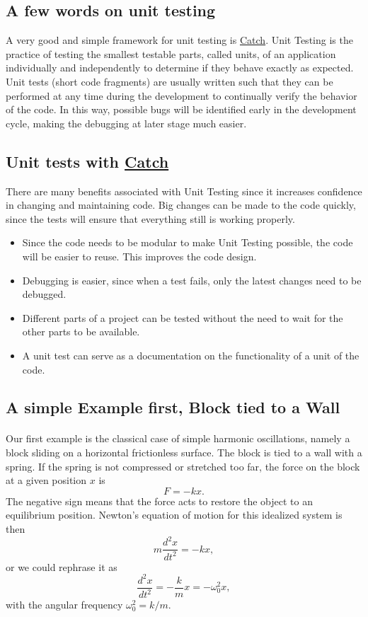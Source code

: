 \documentclass[%
oneside,                 %
final,                   %
10pt]{article}
\begin{document}
\noindent
\subsection*{A few words on unit testing}
A very good and simple framework for unit testing is \href{{https://github.com/philsquared/Catch}}{Catch}.
Unit Testing is the practice of testing the smallest testable parts,
called units, of an application individually and independently to
determine if they behave exactly as expected. Unit tests (short code
fragments) are usually written such that they can be performed at any
time during the development to continually verify the behavior of the
code. In this way, possible bugs will be identified early in the
development cycle, making the debugging at later stage much
easier.


\subsection*{Unit tests with \href{{https://github.com/philsquared/Catch}}{Catch}}
There are many benefits associated with Unit Testing since it  increases confidence in changing and maintaining code. Big changes can be made to the code quickly, since the tests will ensure that everything still is working properly.
\begin{itemize}
 \item Since the code needs to be modular to make Unit Testing possible, the code will be easier to reuse. This improves the code design.

 \item Debugging is easier, since when a test fails, only the latest changes need to be debugged.

 \item Different parts of a project can be tested without the need to wait for the other parts to be available.

 \item A unit test can serve as a documentation on the functionality of a unit of the code.
\end{itemize}

\noindent
\subsection*{A simple Example first, Block tied to a Wall}

\paragraph{}
Our first example is the classical case of simple harmonic oscillations, namely a block sliding on a horizontal frictionless surface. The block is tied to a wall with a spring. If the spring is not compressed or stretched too far, the force on the block at a given position $x$ is 
  \[
      F=-kx.
  \]
The negative sign means that the force acts to restore the object to an equilibrium position. Newton's equation of motion for this idealized system is then 
  \[
    m\frac{d^2x}{dt^2}=-kx,
  \]
or we could rephrase it as
  \[
   \frac{d^2x}{dt^2}=-\frac{k}{m}x=-\omega_0^2x,
    \label{eq:newton1}
  \]
with the angular frequency $\omega_0^2=k/m$. 
\end{document}
